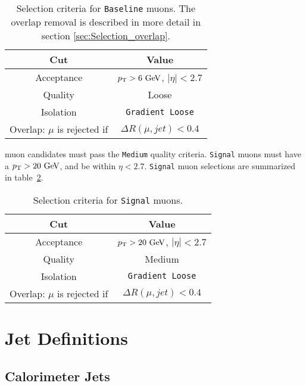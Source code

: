 \begin{table}[htp]
  \begin{center}
    \begin{tabular}{c|c} \hline \hline
      Cut & Value \\ \hline \hline
      Acceptance & $\pT > 6\gev$, $|\eta| < 2.7$ \\ \hline
      Quality & Loose \\ \hline
      Isolation & {\tt Gradient Loose} \\ \hline
      Overlap: $\mu$ is rejected if &  $ \Delta R(\mu,jet) < 0.4 $ \\ \hline
      \hline
    \end{tabular}
  \caption{Selection criteria for {\tt Baseline} muons. The overlap removal is described in more detail in section \ref{sec:Selection_overlap}.} 
  \end{center}
  \label{tb:muons:baseline}
\end{table}%

 muon candidates must pass the {\tt Medium} quality criteria.  {\tt Signal} muons must have a $\pT > 20 \gev$, and be within $\eta < 2.7$.  {\tt Signal} muon selections are summarized in table~\ref{tb:muons:signal}. \\  

\begin{table}[htp]
  \begin{center}
    \begin{tabular}{c|c} \hline \hline
      Cut & Value \\ \hline \hline
      Acceptance & $\pT > 20\gev$, $|\eta| < 2.7$ \\ \hline
      Quality & Medium \\ \hline
      Isolation & {\tt Gradient Loose} \\ \hline
      Overlap: $\mu$ is rejected if &  $ \Delta R(\mu,jet) < 0.4 $ \\ \hline
      \hline
    \end{tabular}
  \caption{Selection criteria for {\tt Signal} muons.} 
  \end{center}
  \label{tb:muons:signal}
\end{table}%

\section{Jet Definitions}
\subsection{Calorimeter Jets}
\label{sec:def:jets}

